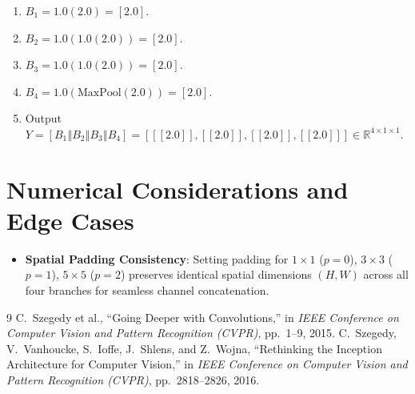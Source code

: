 \documentclass[11pt,a4paper]{article}
\theoremstyle{definition}
\begin{document}
\begin{enumerate}
    \item $B_1 = 1.0(2.0) = [2.0]$.
    \item $B_2 = 1.0(1.0(2.0)) = [2.0]$.
    \item $B_3 = 1.0(1.0(2.0)) = [2.0]$.
    \item $B_4 = 1.0(\text{MaxPool}(2.0)) = [2.0]$.
    \item Output $Y = [B_1 \mathbin{\Vert} B_2 \mathbin{\Vert} B_3 \mathbin{\Vert} B_4] = [[[2.0]], [[2.0]], [[2.0]], [[2.0]]] \in \mathbb{R}^{4 \times 1 \times 1}$.
\end{enumerate}

\section{Numerical Considerations and Edge Cases}

\begin{itemize}
    \item \textbf{Spatial Padding Consistency}: Setting padding for $1 \times 1$ ($p=0$), $3 \times 3$ ($p=1$), $5 \times 5$ ($p=2$) preserves identical spatial dimensions $(H, W)$ across all four branches for seamless channel concatenation.
\end{itemize}

\begin{thebibliography}{9}
 C.~Szegedy et al., ``Going Deeper with Convolutions,'' in \emph{IEEE Conference on Computer Vision and Pattern Recognition (CVPR)}, pp.~1--9, 2015.
 C.~Szegedy, V.~Vanhoucke, S.~Ioffe, J.~Shlens, and Z.~Wojna, ``Rethinking the Inception Architecture for Computer Vision,'' in \emph{IEEE Conference on Computer Vision and Pattern Recognition (CVPR)}, pp.~2818--2826, 2016.
\end{thebibliography}
\end{document}
